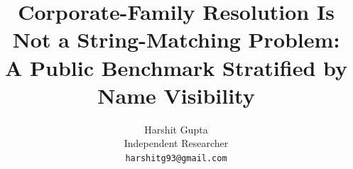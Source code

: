 \documentclass[11pt]{article}
\title{Corporate-Family Resolution Is Not a String-Matching Problem:\\
A Public Benchmark Stratified by Name Visibility}
\author{Harshit Gupta\\
\small Independent Researcher\\
\small \texttt{harshitg93@gmail.com}}
\date{}
\begin{document}
\maketitle

\begin{abstract}

\end{abstract}




\end{document}
